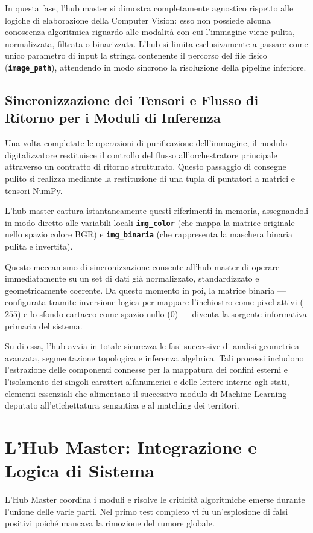 \documentclass[12pt,a4paper]{article}
\begin{document}
    In questa fase, l'hub master si dimostra completamente agnostico rispetto alle logiche di elaborazione della Computer Vision: esso non possiede alcuna conoscenza algoritmica riguardo alle modalità con cui l'immagine viene pulita, normalizzata, filtrata o binarizzata. L'hub si limita esclusivamente a passare come unico parametro di input la stringa contenente il percorso del file fisico (\textbf{\texttt{image\_path}}), attendendo in modo sincrono la risoluzione della pipeline inferiore.

    \subsection{Sincronizzazione dei Tensori e Flusso di Ritorno per i Moduli di Inferenza}
    Una volta completate le operazioni di purificazione dell'immagine, il modulo digitalizzatore restituisce il controllo del flusso all'orchestratore principale attraverso un contratto di ritorno strutturato. Questo passaggio di consegne pulito si realizza mediante la restituzione di una tupla di puntatori a matrici e tensori NumPy.

    L'hub master cattura istantaneamente questi riferimenti in memoria, assegnandoli in modo diretto alle variabili locali \textbf{\texttt{img\_color}} (che mappa la matrice originale nello spazio colore BGR) e \textbf{\texttt{img\_binaria}} (che rappresenta la maschera binaria pulita e invertita).

    Questo meccanismo di sincronizzazione consente all'hub master di operare immediatamente su un set di dati già normalizzato, standardizzato e geometricamente coerente. Da questo momento in poi, la matrice binaria — configurata tramite inversione logica per mappare l'inchiostro come pixel attivi ($255$) e lo sfondo cartaceo come spazio nullo ($0$) — diventa la sorgente informativa primaria del sistema.

    Su di essa, l'hub avvia in totale sicurezza le fasi successive di analisi geometrica avanzata, segmentazione topologica e inferenza algebrica. Tali processi includono l'estrazione delle componenti connesse per la mappatura dei confini esterni e l'isolamento dei singoli caratteri alfanumerici e delle lettere interne agli stati, elementi essenziali che alimentano il successivo modulo di Machine Learning deputato all'etichettatura semantica e al matching dei territori.

	\section{L'Hub Master: Integrazione e Logica di Sistema}
	L'Hub Master coordina i moduli e risolve le criticità algoritmiche emerse durante l'unione delle varie parti. Nel primo test completo vi fu un'esplosione di falsi positivi poiché mancava la rimozione del rumore globale.
\end{document}
